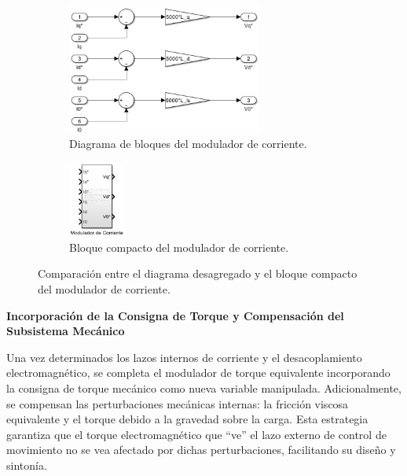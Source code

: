 \documentclass{article}
\begin{document}
\begin{figure}[H]
    \centering
    \begin{subfigure}[t]{\textwidth}
        \centering
        \includegraphics[width=0.7\textwidth]{Imagenes/modulador_corriente.png}
        \caption{Diagrama de bloques del modulador de corriente.}
        \label{fig:modulador_corrientes}
    \end{subfigure}
    
    \vspace{0.5cm} %
    
    \begin{subfigure}[t]{\textwidth}
        \centering
        \includegraphics[width=0.2\textwidth]{Imagenes/modulador_corriente_compacto.png}
        \caption{Bloque compacto del modulador de corriente.}
        \label{fig:modulador_corriente_desacople_realimentaciones_compacto}
    \end{subfigure}
    
    \caption{Comparación entre el diagrama desagregado y el bloque compacto del modulador de corriente.}
    \label{fig:modulador_corriente}
\end{figure}


\newpage
\textbf{Incorporación de la Consigna de Torque y Compensación del Subsistema Mecánico}

Una vez determinados los lazos internos de corriente y el desacoplamiento electromagnético, se completa el modulador de torque equivalente incorporando la consigna de torque mecánico como nueva variable manipulada. Adicionalmente, se compensan las perturbaciones mecánicas internas: la fricción viscosa equivalente y el torque debido a la gravedad sobre la carga. Esta estrategia garantiza que el torque electromagnético que “ve” el lazo externo de control de movimiento no se vea afectado por dichas perturbaciones, facilitando su diseño y sintonía.
\end{document}
